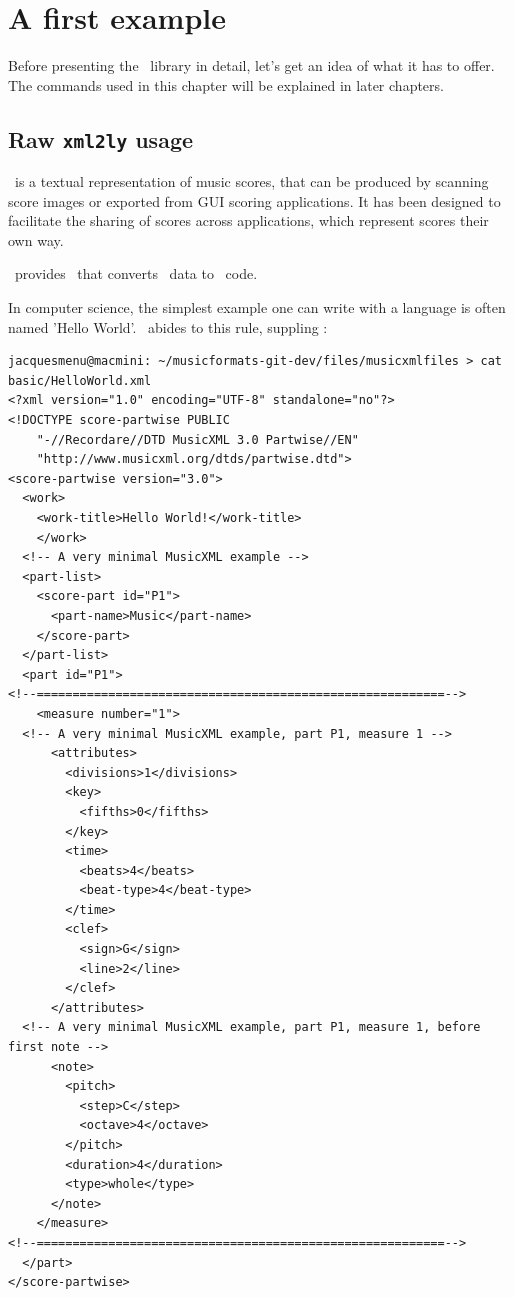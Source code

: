 
\chapter{A first example}

Before presenting the \mf\ library in detail, let's get an idea of what it has to offer. The commands used in this chapter will be explained in later chapters.


\section{Raw {\tt xml2ly} usage}

\mxml\ is a textual representation of music scores, that can be produced by scanning score images or exported from GUI scoring applications. It has been designed to facilitate the sharing of scores across applications, which represent scores their own way.

\mf\ provides \xmlToLy\, that converts \mxml\ data to \lily\ code.

In computer science, the simplest example one can write with a language is often named 'Hello World'. \mf\ abides to this rule, suppling :
\begin{lstlisting}[language=MusicXML]
jacquesmenu@macmini: ~/musicformats-git-dev/files/musicxmlfiles > cat basic/HelloWorld.xml
<?xml version="1.0" encoding="UTF-8" standalone="no"?>
<!DOCTYPE score-partwise PUBLIC
    "-//Recordare//DTD MusicXML 3.0 Partwise//EN"
    "http://www.musicxml.org/dtds/partwise.dtd">
<score-partwise version="3.0">
  <work>
    <work-title>Hello World!</work-title>
    </work>
  <!-- A very minimal MusicXML example -->
  <part-list>
    <score-part id="P1">
      <part-name>Music</part-name>
    </score-part>
  </part-list>
  <part id="P1">
<!--=========================================================-->
    <measure number="1">
  <!-- A very minimal MusicXML example, part P1, measure 1 -->
      <attributes>
        <divisions>1</divisions>
        <key>
          <fifths>0</fifths>
        </key>
        <time>
          <beats>4</beats>
          <beat-type>4</beat-type>
        </time>
        <clef>
          <sign>G</sign>
          <line>2</line>
        </clef>
      </attributes>
  <!-- A very minimal MusicXML example, part P1, measure 1, before first note -->
      <note>
        <pitch>
          <step>C</step>
          <octave>4</octave>
        </pitch>
        <duration>4</duration>
        <type>whole</type>
      </note>
    </measure>
<!--=========================================================-->
  </part>
</score-partwise>
\end{lstlisting}


